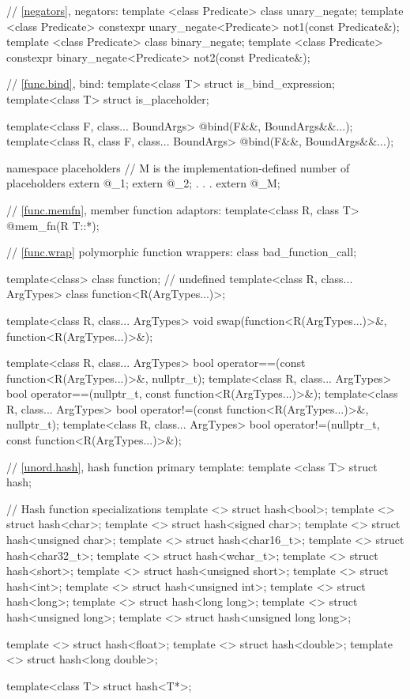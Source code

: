 \begin{codeblock}
{  // \ref{negators}, negators:
  template <class Predicate> class unary_negate;
  template <class Predicate>
    constexpr unary_negate<Predicate> not1(const Predicate&);
  template <class Predicate> class binary_negate;
  template <class Predicate>
    constexpr binary_negate<Predicate> not2(const Predicate&);

  // \ref{func.bind}, bind:
  template<class T> struct is_bind_expression;
  template<class T> struct is_placeholder;

  template<class F, class... BoundArgs>
    @\unspec@ bind(F&&, BoundArgs&&...);
  template<class R, class F, class... BoundArgs>
    @\unspec@ bind(F&&, BoundArgs&&...);

  namespace placeholders {
    // M is the implementation-defined number of placeholders
    extern @\unspec@ _1;
    extern @\unspec@ _2;
                .
                .
                .
    extern @\unspec@ _M;
  }

  // \ref{func.memfn}, member function adaptors:
  template<class R, class T> @\unspec@ mem_fn(R T::*);

  // \ref{func.wrap} polymorphic function wrappers:
  class bad_function_call;

  template<class> class function; // undefined
  template<class R, class... ArgTypes> class function<R(ArgTypes...)>;

  template<class R, class... ArgTypes>
    void swap(function<R(ArgTypes...)>&, function<R(ArgTypes...)>&);

  template<class R, class... ArgTypes>
    bool operator==(const function<R(ArgTypes...)>&, nullptr_t);
  template<class R, class... ArgTypes>
    bool operator==(nullptr_t, const function<R(ArgTypes...)>&);
  template<class R, class... ArgTypes>
    bool operator!=(const function<R(ArgTypes...)>&, nullptr_t);
  template<class R, class... ArgTypes>
    bool operator!=(nullptr_t, const function<R(ArgTypes...)>&);

  // \ref{unord.hash}, hash function primary template:
  template <class T> struct hash;

  // Hash function specializations
  template <> struct hash<bool>;
  template <> struct hash<char>;
  template <> struct hash<signed char>;
  template <> struct hash<unsigned char>;
  template <> struct hash<char16_t>;
  template <> struct hash<char32_t>;
  template <> struct hash<wchar_t>;
  template <> struct hash<short>;
  template <> struct hash<unsigned short>;
  template <> struct hash<int>;
  template <> struct hash<unsigned int>;
  template <> struct hash<long>;
  template <> struct hash<long long>;
  template <> struct hash<unsigned long>;
  template <> struct hash<unsigned long long>;

  template <> struct hash<float>;
  template <> struct hash<double>;
  template <> struct hash<long double>;

  template<class T> struct hash<T*>;
}
\end{codeblock}

